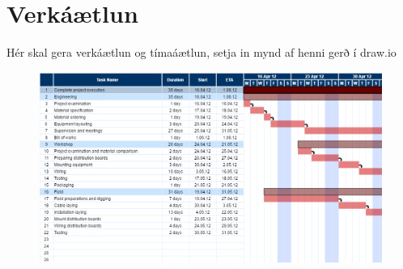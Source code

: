 \section{Verkáætlun}
Hér skal gera verkáætlun og tímaáætlun, setja in mynd af henni gerð í draw.io
\begin{figure}[h]
\includegraphics[scale=.5]{img/gant}
\end{figure}
